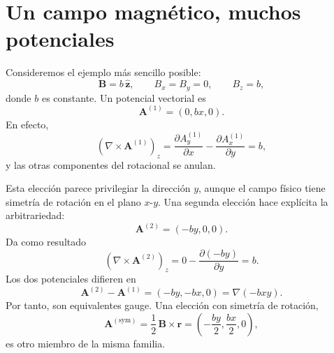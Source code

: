 \begin{classroomqa}
\end{classroomqa}

\section{Un campo magnético, muchos potenciales}

Consideremos el ejemplo más sencillo posible:
\begin{equation}
  \mathbf B=b\,\hat{\mathbf z},
  \qquad
  B_x=B_y=0,
  \qquad
  B_z=b,
\end{equation}
donde \(b\) es constante. Un potencial vectorial es
\begin{equation}
  \mathbf A^{(1)}=(0,bx,0).
\end{equation}
En efecto,
\begin{equation}
  (\nabla\times\mathbf A^{(1)})_z
  =
  \frac{\partial A_y^{(1)}}{\partial x}
  -\frac{\partial A_x^{(1)}}{\partial y}
  =b,
\end{equation}
y las otras componentes del rotacional se anulan.

Esta elección parece privilegiar la dirección \(y\), aunque el campo físico tiene simetría de rotación en el plano \(x\)-\(y\). Una segunda elección hace explícita la arbitrariedad:
\begin{equation}
  \mathbf A^{(2)}=(-by,0,0).
\end{equation}
Da como resultado
\begin{equation}
  (\nabla\times\mathbf A^{(2)})_z
  =
  0-\frac{\partial(-by)}{\partial y}
  =b.
\end{equation}
Los dos potenciales difieren en
\begin{equation}
  \mathbf A^{(2)}-\mathbf A^{(1)}
  =
  (-by,-bx,0)
  =
  \nabla(-bxy).
\end{equation}
Por tanto, son equivalentes gauge. Una elección con simetría de rotación,
\begin{equation}
  \mathbf A^{(\mathrm{sym})}
  =
  \frac12\,\mathbf B\times\mathbf r
  =
  \left(-\frac{by}{2},\frac{bx}{2},0\right),
\end{equation}
es otro miembro de la misma familia.

